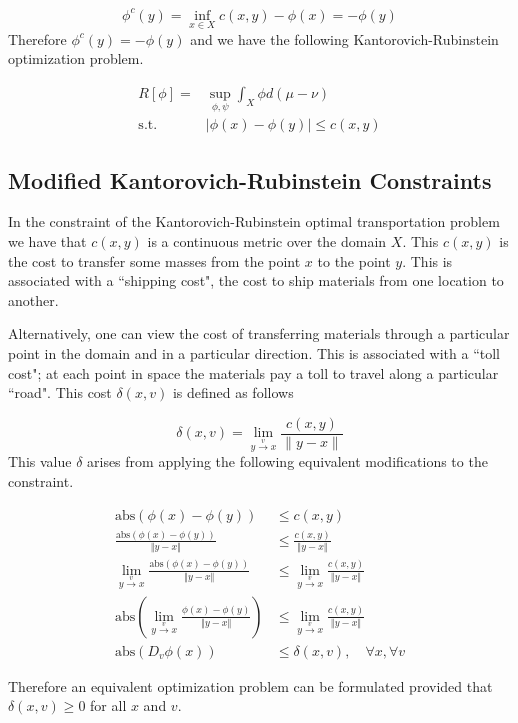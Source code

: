 \documentclass[12pt]{article}
\newcommand{\abs}{\text{abs}}
\begin{document}
$$\phi^c(y)=\inf_{x\in X} c(x,y)-\phi(x)=-\phi(y)$$
\noindent
Therefore $\phi^c(y)=-\phi(y)$ and we have the following Kantorovich-Rubinstein optimization problem.

\begin{align*}
R[\phi]=&\sup_{\phi,\psi} \int_X\phi d(\mu-\nu) \\
\text{s.t.} \quad & |\phi(x)-\phi(y)| \leq c(x,y)
\end{align*}


\subsection{Modified Kantorovich-Rubinstein Constraints}

In the constraint of the Kantorovich-Rubinstein optimal transportation problem we have that $c(x,y)$ is a continuous metric over the domain $X$. This $c(x,y)$ is the cost to transfer some masses from the point $x$ to the point $y$. This is associated with a ``shipping cost", the cost to ship materials from one location to another.

Alternatively, one can view the cost of transferring materials through a particular point in the domain and in a particular direction. This is associated with a ``toll cost"; at each point in space the materials pay a toll to travel along a particular ``road". This cost $\delta(x,v)$ is defined as follows

$$\delta(x,v) = \lim_{y\xrightarrow{v} x} \frac{c(x,y)}{\lVert y-x\rVert}$$
\noindent
This value $\delta$ arises from applying the following equivalent modifications to the constraint.

\begin{align*}
\abs(\phi(x)-\phi(y)) &\leq c(x,y)\\
\frac{\abs(\phi(x)-\phi(y))}{\Vert y-x\Vert}&\leq \frac{c(x,y)}{\Vert y-x\Vert}\\
\lim_{y\xrightarrow{v} x}\frac{\abs(\phi(x)-\phi(y))}{\Vert y-x\Vert}&\leq \lim_{y\xrightarrow{v} x}\frac{c(x,y)}{\Vert y-x\Vert}\\
\abs\left(\lim_{y\xrightarrow{v} x}\frac{\phi(x)-\phi(y)}{\Vert y-x\Vert}\right)&\leq \lim_{y\xrightarrow{v} x}\frac{c(x,y)}{\Vert y-x\Vert}\\
\abs(D_v\phi(x))&\leq\delta(x,v),\quad \forall x,\forall v
\end{align*}

Therefore an equivalent optimization problem can be formulated provided that $\delta(x,v)\geq 0$ for all $x$ and $v$.
\end{document}
